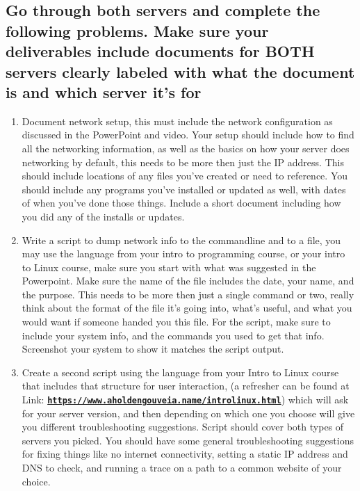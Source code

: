 \documentclass[12pt]{article}
\begin{document}
\subsection*{Go through both servers and complete the following problems.  Make sure your deliverables include documents for BOTH servers clearly labeled with what the document is and which server it's for}
    \begin{enumerate}
        \item Document network setup, this must include the network configuration as discussed in the PowerPoint and video. Your setup should include how to find all the networking information, as well as the basics on how your server does networking by default, this needs to be more then just the IP address. This should include locations of any files you've created or need to reference. You should include any programs you've installed or updated as well, with dates of when you've done those things. Include a short document including how you did any of the installs or updates. 
        \item Write a script to dump network info to the commandline and to a file, you may use the language from your intro to programming course, or your intro to Linux course, make sure you start with what was suggested in the Powerpoint.  Make sure the name of the file includes the date, your name, and the purpose.  This needs to be more then just a single command or two, really think about the format of the file it's going into, what's useful, and what you would want if someone handed you this file. For the script, make sure to include your system info, and the commands you used to get that info. Screenshot your system to show it matches the script output.
        \item Create a second script using the language from your Intro to Linux course that includes that structure for user interaction, (a refresher can be found at Link: \href{https://www.aholdengouveia.name/introlinux.html}{\textbf{\nolinkurl{https://www.aholdengouveia.name/introlinux.html}}}) which will ask for your server version, and then depending on which one you choose will give you different troubleshooting suggestions.  Script should cover both types of servers you picked.  You should have some general troubleshooting suggestions for fixing things like no internet connectivity, setting a static IP address and DNS to check, and running a trace on a path to a common website of your choice. 
    \end{enumerate}
\end{document}
